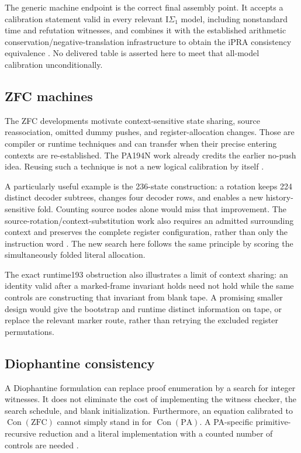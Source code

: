 \documentclass[11pt]{article}
\newcommand{\PA}{\mathrm{PA}}
\newcommand{\IS}{\mathrm I\Sigma_1}
\newcommand{\Con}{\operatorname{Con}}
\begin{document}
The generic machine endpoint is the correct final assembly point. It
accepts a calibration statement valid in every relevant $\IS$ model,
including nonstandard time and refutation witnesses, and combines it
with the established arithmetic conservation/negative-translation
infrastructure to obtain the iPRA consistency equivalence
\cite{generic-endpoint,transfer}. No delivered table is asserted here
to meet that all-model calibration unconditionally.

\subsection{ZFC machines}

The ZFC developments motivate context-sensitive state sharing, source
reassociation, omitted dummy pushes, and register-allocation changes.
Those are compiler or runtime techniques and can transfer when their
precise entering contexts are re-established. The PA194N work already
credits the earlier no-push idea. Reusing such a technique is not a new
logical calibration by itself \cite{zfc-status}.

A particularly useful example is the 236-state construction: a rotation
keeps 224 distinct decoder subtrees, changes four decoder rows, and
enables a new history-sensitive fold. Counting source nodes alone would
miss that improvement. The source-rotation/context-substitution work also
requires an admitted surrounding context and preserves the complete
register configuration, rather than only the instruction word
\cite{zfc-rotation,zfc-context}. The new search here follows the same
principle by scoring the simultaneously folded literal allocation.

The exact runtime193 obstruction also illustrates a limit of context
sharing: an identity valid after a marked-frame invariant holds need
not hold while the same controls are constructing that invariant from
blank tape. A promising smaller design would give the bootstrap and
runtime distinct information on tape, or replace the relevant marker
route, rather than retrying the excluded register permutations.

\subsection{Diophantine consistency}

A Diophantine formulation can replace proof enumeration by a search for
integer witnesses. It does not eliminate the cost of implementing
the witness checker, the search schedule, and blank initialization.
Furthermore, an equation calibrated to $\Con(\mathrm{ZFC})$ cannot
simply stand in for $\Con(\PA)$. A PA-specific primitive-recursive
reduction and a literal implementation with a counted number of
controls are needed \cite{diophantine-status}.
\end{document}

